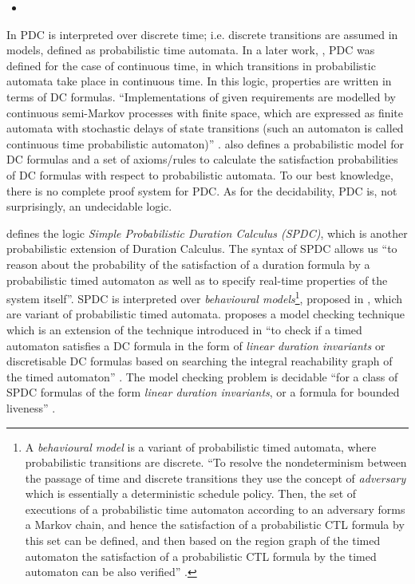 \documentclass[11pt]{article}
\begin{document}
\begin{itemize}
\item 
\end{itemize}


In \cite{LRSZ92} PDC is interpreted over discrete time; i.e. discrete transitions are assumed in models, defined as probabilistic time automata. In a later work, \cite{HC94}, PDC was defined for the case of continuous time, in which  transitions in probabilistic automata take place in continuous time. In this logic, properties are written in terms of  DC formulas. ``Implementations of given requirements are modelled by continuous semi-Markov processes with finite space, which are expressed as finite automata with stochastic delays of state transitions (such an automaton is called continuous time probabilistic automaton)'' \cite{HC94}. \cite{HC94} also defines a probabilistic model for DC formulas and a set of axioms/rules to calculate the satisfaction probabilities of DC formulas with respect to probabilistic automata. To our best knowledge, there is no complete proof system for PDC. As for the decidability,  PDC is, not surprisingly, an undecidable logic.

\cite{HZ07} defines the logic \emph{Simple Probabilistic Duration Calculus (SPDC)}, which is another probabilistic extension of Duration Calculus. The syntax of SPDC allows us ``to reason about the probability of the satisfaction of a duration formula by a probabilistic timed automaton as well as to specify real-time properties of the system itself''. SPDC is interpreted over \emph{behavioural models}\footnote{A \emph{behavioural model} is a variant of probabilistic timed automata, where probabilistic transitions are discrete. ``To resolve the nondeterminism between the passage of time and discrete transitions they use the concept of \emph{adversary} which is essentially a deterministic schedule policy. Then, the set of executions of a probabilistic time automaton according to an adversary forms a Markov chain, and hence the satisfaction of a probabilistic CTL formula by this set can be defined, and then based on the region graph of the timed automaton the satisfaction of a probabilistic CTL formula by the timed automaton can be also verified'' \cite{CH06}.}, proposed in \cite{KNSS02}, which are variant of probabilistic timed automata. \cite{HZ07} proposes a model checking technique which is an extension of the technique introduced in \cite{TH04} ``to check if a timed automaton satisfies a DC formula in the form of \emph{linear duration invariants} or discretisable DC formulas based on searching the integral reachability graph of the timed automaton'' \cite{HZ07} . The model checking problem is decidable ``for a class of SPDC formulas of the form \emph{linear duration invariants}, or a formula for bounded liveness'' \cite{HZ07}.
\end{document}
